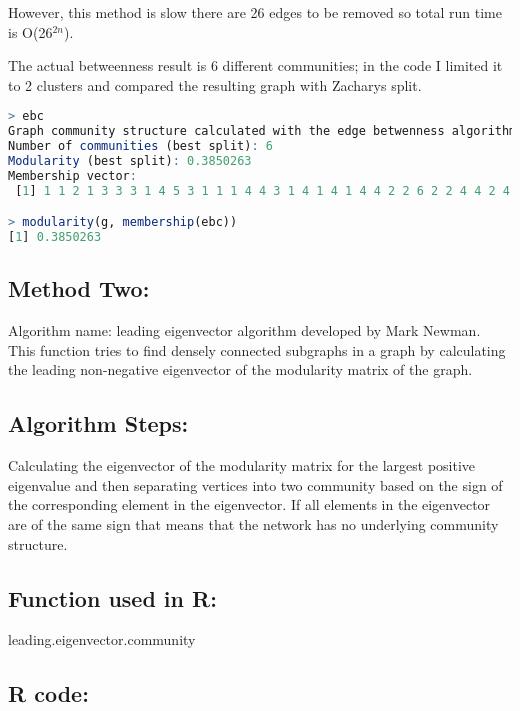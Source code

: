 \documentclass[letterpaper,11pt]{article}
\begin{document}
However, this method is slow there are 26 edges to be removed so total run time is O(26$^{2n}$).

The actual betweenness result is 6 different communities; in the code I limited it to 2 clusters and compared the resulting graph with Zacharys split.

\noindent
\begin{minipage}{\linewidth}
\label{visina8}
\end{minipage}

\begin{lstlisting}[language=R,frame=single]
> ebc
Graph community structure calculated with the edge betwenness algorithm
Number of communities (best split): 6 
Modularity (best split): 0.3850263 
Membership vector:
 [1] 1 1 2 1 3 3 3 1 4 5 3 1 1 1 4 4 3 1 4 1 4 1 4 4 2 2 6 2 2 4 4 2 4 4

> modularity(g, membership(ebc))
[1] 0.3850263
\end{lstlisting}


\newpage
\subsection{\huge Method Two:}
Algorithm name: leading eigenvector algorithm developed by Mark Newman.\\
This function tries to find densely connected subgraphs in a graph by calculating the leading non-negative eigenvector of the modularity matrix of the graph.

\subsection*{Algorithm Steps:}
Calculating the eigenvector of the modularity matrix for the largest positive eigenvalue and then separating vertices into two community based on the sign of the corresponding element in the eigenvector. If all elements in the eigenvector are of the same sign that means that the network has no underlying community structure.

\subsection*{Function used in R:}
leading.eigenvector.community 

\subsection*{R code:}
\end{document}
